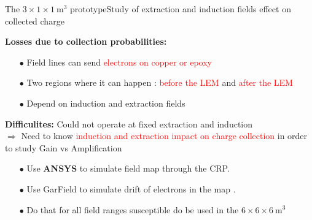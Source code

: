 \documentclass[10pt]{beamer}
\begin{document}
    \begin{frame}{The \texorpdfstring{$3 \times 1 \times \SI{1}{\meter\cubed}$}{311} prototype}{Study of extraction and induction fields effect on collected charge}
    	\begin{scriptsize}
    		\begin{minipage}{0.58\textwidth}
    			\textbf{Losses due to collection probabilities:}
    			\begin{itemize}
    				\item[$\bullet$] Field lines can send \textcolor{red}{electrons on copper or epoxy}
    				\item[$\bullet$] Two regions where it can happen : \textcolor{red}{before the LEM} and \textcolor{red}{after the LEM}
    				\item[$\bullet$] Depend on induction and extraction fields
    			\end{itemize}
    			\textbf{Difficulites:} Could not operate at fixed extraction and induction\\$\Rightarrow$ Need to know \textcolor{red}{induction and extraction impact on charge collection} in order to study Gain vs Amplification
    			\begin{itemize}
    				\item[$\bullet$] Use \textbf{ANSYS} to simulate field map through the CRP.
    				\item[$\bullet$] Use GarField to simulate drift of electrons in the map .
    				\item[$\bullet$] Do that for all field ranges susceptible do be used in  the $6 \times 6 \times \SI{6}{\meter\cubed}$
    			\end{itemize}
    		\end{minipage}
    		\begin{minipage}{0.38\textwidth}
    			\centering

\end{minipage}
\end{scriptsize}
\end{frame}
\end{document}
